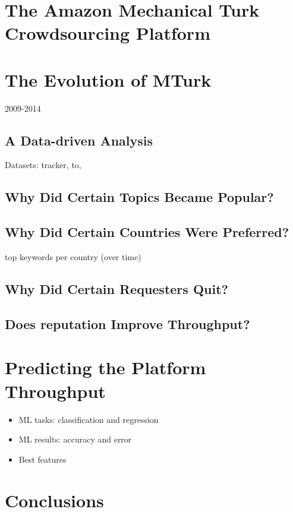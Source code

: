 \documentclass{sig-alternate}
\begin{document}





\section{The Amazon Mechanical Turk Crowdsourcing Platform}

\section{The Evolution of MTurk}
2009-2014
\subsection{A Data-driven Analysis}
Datasets: tracker, to, 
\subsection{Why Did Certain Topics Became Popular?}
\subsection{Why Did Certain Countries Were Preferred?}
top keywords per country (over time)
\subsection{Why Did Certain Requesters Quit?}
\subsection{Does reputation Improve Throughput?}

\section{Predicting the Platform Throughput}
\begin{itemize}

	\item ML tasks: classification and regression

	\item ML results: accuracy and error

	\item Best features

\end{itemize}

\section{Conclusions}
\end{document}
